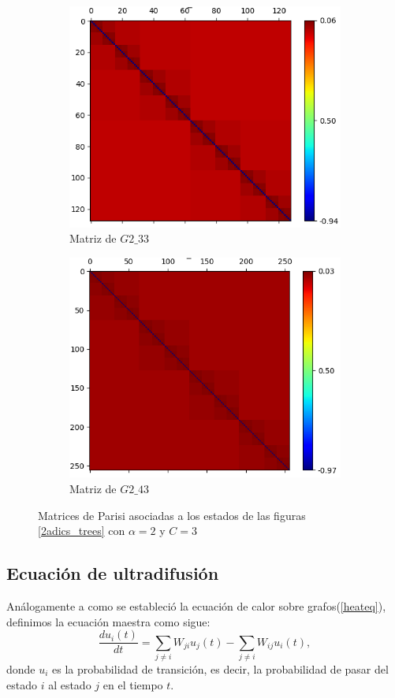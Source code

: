 \begin{figure}
\begin{subfigure}{.6\textwidth}
		\centering
		\includegraphics[width=.8\linewidth]{img/matrix/matrixG2_33}
		\caption{Matriz de $\mathit{G2\_33}$}
		\label{fig:sfig1}
	\end{subfigure}%
	\begin{subfigure}{.6\textwidth}
		\centering
		\includegraphics[width=.8\linewidth]{img/matrix/matrixG2_43}
		\caption{Matriz de $\mathit{G2\_43}$}
		\label{fig:sfig1}
	\end{subfigure}%
	
	\caption{Matrices de Parisi asociadas a los estados de las figuras \ref{2adics_trees} con $\alpha=2$ y $C=3$}
	\label{2adic_matrices}
\end{figure}
\pagebreak

\subsection{Ecuación de ultradifusión}
Análogamente a como se estableció la ecuación de calor sobre grafos(\ref{heateq}), definimos la ecuación maestra como sigue:
\begin{equation}
\label{ME}
\frac{du_i(t)}{dt} = \sum_{j\neq i}W_{ji}u_j(t) - \sum_{j\neq i}W_{ij}u_i(t), 
\end{equation}
donde $u_i$ es la probabilidad de transición, es decir, la probabilidad de pasar del estado $i$ al estado $j$ en el tiempo $t$.

